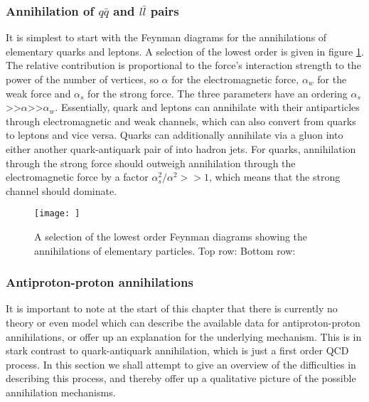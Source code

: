 \subsubsection{Annihilation of $q\bar{q}$ and $l\bar{l}$ pairs}
It is simplest to start with the Feynman diagrams for the annihilations of elementary quarks and leptons. A selection of the lowest order is given in figure \ref{fig:annihilationsFeynmanElementary}. The relative contribution is proportional to the force's interaction strength to the power of the number of vertices, so $\alpha$ for the electromagnetic force, $\alpha_w$ for the weak force and $\alpha_s$ for the strong force. The three parameters have an ordering $\alpha_s$>>$\alpha$>>$\alpha_w$. Essentially, quark and leptons can annihilate with their antiparticles through electromagnetic and weak channels, which can also convert from quarks to leptons and vice versa. Quarks can additionally annihilate via a gluon into either another quark-antiquark pair of into hadron jets. For quarks, annihilation through the strong force should outweigh annihilation through the electromagnetic force by a factor $\alpha_s^2/\alpha^2 >>1$, which means that the strong channel should dominate. 

\begin{figure}
    \centering
    \texttt{[image: ]}
    \caption{A selection of the lowest order Feynman diagrams showing the annihilations of elementary particles. Top row: Bottom row: }
    \label{fig:annihilationsFeynmanElementary}
\end{figure}

\subsubsection{Antiproton-proton annihilations}
It is important to note at the start of this chapter that there is currently no theory or even model which can describe the available data for antiproton-proton annihilations, or offer up an explanation for the underlying mechanism\cite{}. This is in stark contrast to quark-antiquark annihilation, which is just a first order QCD process. In this section we shall attempt to give an overview of the difficulties in describing this process, and thereby offer up a qualitative picture of the possible annihilation mechanisms.\\

